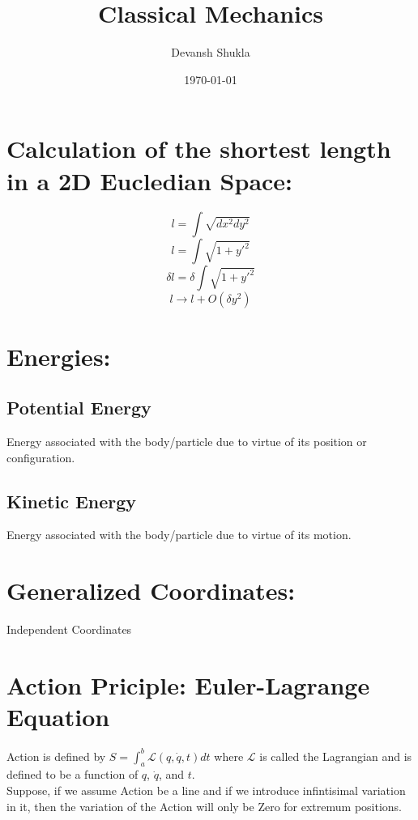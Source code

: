 \documentclass[a4paper]{article}
\title{Classical Mechanics}
\author{Devansh Shukla}
\date{\today}
\newcommand{\Lagr}{\mathcal{L}}
\begin{document}
	\maketitle

	\section*{Calculation of the shortest length in a 2D Eucledian Space: }
		\noindent
		
		$$ l = \int \sqrt{dx^2 dy^2} $$
		$$ l = \int \sqrt{1 + y'^2} $$
		$$ {\delta}l = {\delta}\int \sqrt{1 + y'^2} $$
		$$ l \rightarrow l + O(\delta y^2) $$

	
	\section*{Energies: }
		\subsection*{Potential Energy}
			Energy associated with the body/particle due to virtue of its position or configuration.
		\subsection*{Kinetic Energy}
			Energy associated with the body/particle due to virtue of its motion.

	\section*{Generalized Coordinates: }

		\noindent
		Independent Coordinates

	\section*{Action Priciple: Euler-Lagrange Equation }
		
		\noindent
		
		Action is defined by $S = \int_a^b \Lagr(q, \dot{q}, t) dt$ where $\Lagr$ is called the Lagrangian and is defined to be a function of $q$, $\dot{q}$, and $t$. \hfill \\

		Suppose, if we assume Action be a line and if we introduce infintisimal variation in it, then the variation of the Action will only be Zero for extremum positions.
\end{document}
